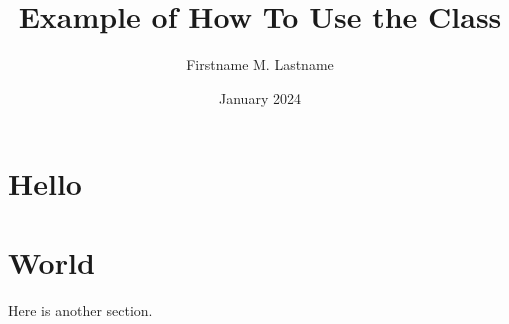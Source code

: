 \documentclass{cicirello}
\title{Example of How To Use the Class}
\author{Firstname M. Lastname}
\date{January 2024}
\begin{document}
\maketitle

\section{Hello}

\lipsum[2-6]

\section{World}

Here is another section.
\end{document}

